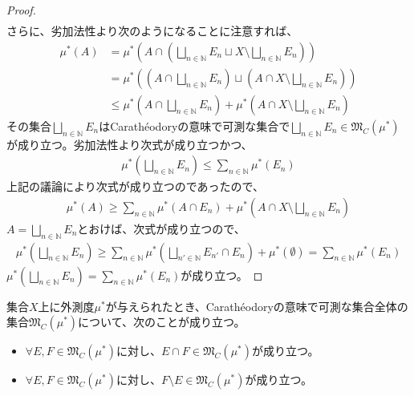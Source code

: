 \documentclass[dvipdfmx]{jsarticle}
\begin{document}
\begin{proof}
\begin{align*}
\end{align*}
さらに、劣加法性より次のようになることに注意すれば、
\begin{align*}
\mu^{*}(A) &= \mu^{*}\left( A \cap \left( \bigsqcup_{n \in \mathbb{N}} E_{n} \sqcup X \setminus \bigsqcup_{n \in \mathbb{N}} E_{n} \right) \right)\\
&= \mu^{*}\left( \left( A \cap \bigsqcup_{n \in \mathbb{N}} E_{n} \right) \sqcup \left( A \cap X \setminus \bigsqcup_{n \in \mathbb{N}} E_{n} \right) \right)\\
&\leq \mu^{*}\left( A \cap \bigsqcup_{n \in \mathbb{N}} E_{n} \right) + \mu^{*}\left( A \cap X \setminus \bigsqcup_{n \in \mathbb{N}} E_{n} \right)
\end{align*}
その集合$\bigsqcup_{n \in \mathbb{N}} E_{n}$はCarathéodoryの意味で可測な集合で$\bigsqcup_{n \in \mathbb{N}} E_{n} \in \mathfrak{M}_{C}\left( \mu^{*} \right)$が成り立つ。劣加法性より次式が成り立つかつ、
\begin{align*}
\mu^{*}\left( \bigsqcup_{n \in \mathbb{N}} E_{n} \right) \leq \sum_{n \in \mathbb{N}} {\mu^{*}\left( E_{n} \right)}
\end{align*}
上記の議論により次式が成り立つのであったので、
\begin{align*}
\mu^{*}(A) \geq \sum_{n \in \mathbb{N}} {\mu^{*}\left( A \cap E_{n} \right)} + \mu^{*}\left( A \cap X \setminus \bigsqcup_{n \in \mathbb{N}} E_{n} \right)
\end{align*}
$A = \bigsqcup_{n \in \mathbb{N}} E_{n}$とおけば、次式が成り立つので、
\begin{align*}
\mu^{*}\left( \bigsqcup_{n \in \mathbb{N}} E_{n} \right) \geq \sum_{n \in \mathbb{N}} {\mu^{*}\left( \bigsqcup_{n' \in \mathbb{N}} E_{n'} \cap E_{n} \right)} + \mu^{*}(\emptyset) = \sum_{n \in \mathbb{N}} {\mu^{*}\left( E_{n} \right)}
\end{align*}
$\mu^{*}\left( \bigsqcup_{n \in \mathbb{N}} E_{n} \right) = \sum_{n \in \mathbb{N}} {\mu^{*}\left( E_{n} \right)}$が成り立つ。
\end{proof}
\begin{thm}\label{4.5.3.7}
集合$X$上に外測度$\mu^{*}$が与えられたとき、Carathéodoryの意味で可測な集合全体の集合$\mathfrak{M}_{C}\left( \mu^{*} \right)$について、次のことが成り立つ。
\begin{itemize}
\item
  $\forall E,F \in \mathfrak{M}_{C}\left( \mu^{*} \right)$に対し、$E \cap F \in \mathfrak{M}_{C}\left( \mu^{*} \right)$が成り立つ。
\item
  $\forall E,F \in \mathfrak{M}_{C}\left( \mu^{*} \right)$に対し、$F \setminus E \in \mathfrak{M}_{C}\left( \mu^{*} \right)$が成り立つ。
\end{itemize}
\end{thm}
\end{document}
